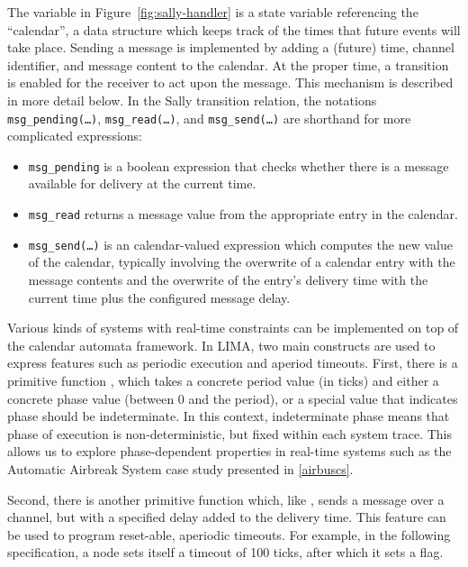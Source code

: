 The variable  in Figure~\ref{fig:sally-handler} is a state variable
referencing the ``calendar'', a data structure which keeps track of the times
that future events will take place. Sending a message is
implemented by adding a (future) time, channel identifier, and message content
to the calendar. At the proper time, a transition is enabled for the receiver
to act upon the message. This mechanism is described in more detail below. In
the Sally transition relation, the notations \texttt{msg\_pending(\ldots)},
\texttt{msg\_read(\ldots)}, and \texttt{msg\_send(\ldots)} are shorthand for more
complicated expressions:

\begin{itemize}
    \item \texttt{msg\_pending} is a boolean expression that checks whether
        there is a message available for delivery at the current time.
    \item \texttt{msg\_read} returns a message value from the appropriate
        entry in the calendar.
    \item \texttt{msg\_send(\ldots)} is an calendar-valued expression which
        computes the new value of the calendar, typically involving the
        overwrite of a calendar entry with the message contents and the overwrite
        of the entry's delivery time with the current time plus the configured
        message delay.
\end{itemize}

Various kinds of systems with real-time constraints can be implemented
on top of the calendar automata framework. In LIMA, two main
constructs are used to express features such as periodic execution
and aperiod timeouts. First, there is a primitive function ,
which takes a concrete period value (in ticks) and either a concrete
phase value (between 0 and the period), or a special value that
indicates phase should be indeterminate. In this context, indeterminate
phase means that phase of execution is non-deterministic, but fixed
within each system trace. This allows us to explore phase-dependent properties
in real-time systems such as the Automatic Airbreak System case study presented in
\ref{airbuscs}.

Second, there is another primitive function  which,
like , sends a message over a channel, but with a specified
delay added to the delivery time. This feature can be used to program
reset-able, aperiodic timeouts. For example, in the following specification, a
node sets itself a timeout of 100 ticks, after which it sets a flag.

